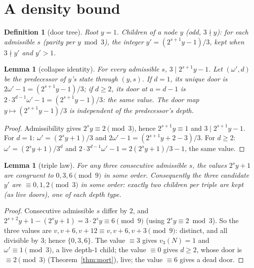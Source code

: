 \documentclass[11pt]{article}
\newtheorem{lemma}[theorem]{Lemma}
\newtheorem{definition}[theorem]{Definition}
\theoremstyle{remark}
\newcommand{\vth}[1]{v_3\!\left(#1\right)}
\newcommand{\w}{\omega}
\begin{document}
\section{A density bound}\label{sec:density}

\begin{definition}[door tree]\label{def:doortree}
Root $y = 1$. Children of a node $y$ (odd, $3\nmid y$): for each admissible $s$ (parity per $y \bmod 3$), the integer $y' = (2^{s+1}y - 1)/3$, kept when $3\nmid y'$ and $y' > 1$.
\end{definition}

\begin{lemma}[collapse identity]\label{lem:collapse}
For every admissible $s$, $3 \mid 2^{s+1}y - 1$. Let $(\w', d)$ be the predecessor of $y$'s state through $(y,s)$. If $d = 1$, its unique door is $2\w' - 1 = (2^{s+1}y-1)/3$; if $d \ge 2$, its door at $a = d-1$ is $2\cdot3^{d-1}\w' - 1 = (2^{s+1}y-1)/3$: \emph{the same value}. The door map $y \mapsto (2^{s+1}y-1)/3$ is independent of the predecessor's depth.
\end{lemma}

\begin{proof}
Admissibility gives $2^s y \equiv 2 \pmod 3$, hence $2^{s+1}y \equiv 1$ and $3 \mid 2^{s+1}y - 1$. For $d = 1$: $\w' = (2^sy+1)/3$ and $2\w' - 1 = (2^{s+1}y + 2 - 3)/3$. For $d \ge 2$: $\w' = (2^sy+1)/3^d$ and $2\cdot3^{d-1}\w' - 1 = 2(2^sy+1)/3 - 1$, the same value.
\end{proof}

\begin{lemma}[triple law]\label{lem:triple}
For any three consecutive admissible $s$, the values $2^s y + 1$ are congruent to $0, 3, 6 \pmod 9$ in some order. Consequently the three candidate $y'$ are $\equiv 0, 1, 2 \pmod 3$ in some order: exactly two children per triple are kept (as live doors), one of each depth type.
\end{lemma}

\begin{proof}
Consecutive admissible $s$ differ by $2$, and $2^{s+2}y + 1 - (2^s y + 1) = 3\cdot2^s y \equiv 6 \pmod 9$ (using $2^s y \equiv 2 \bmod 3$). So the three values are $v, v+6, v+12 \equiv v, v+6, v+3 \pmod 9$: distinct, and all divisible by $3$; hence $\{0,3,6\}$. The value $\equiv 3$ gives $\vth N = 1$ and $\w' \equiv 1 \pmod 3$, a live depth-$1$ child; the value $\equiv 0$ gives $d \ge 2$, whose door is $\equiv 2 \pmod 3$ (Theorem~\ref{thm:mort}), live; the value $\equiv 6$ gives a dead door.
\end{proof}
\end{document}
